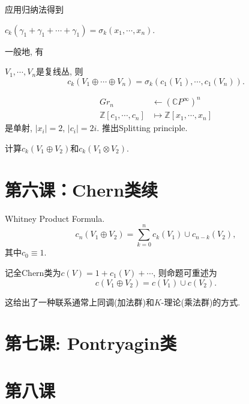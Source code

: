 \quad 应用归纳法得到

\begin{theorem}
    $c_k(\gamma_1 +\gamma_1+\cdots +\gamma_1) = \sigma_k(x_1, \cdots, x_n)$.
\end{theorem}

\quad 一般地, 有

\begin{theorem}
    $V_1, \cdots, V_n$是复线丛, 则
        $$c_k(V_1\oplus \cdots \oplus V_n) = \sigma_k(c_1(V_1), \cdots, c_1(V_n)).$$
\end{theorem}

\begin{align*}
        Gr_n &\leftarrow (\mathbb{C}P^\infty)^n\\
        \mathbb{Z}[c_1, \cdots, c_n] &\mapsto \mathbb{Z}[x_1, \cdots, x_n]
\end{align*}
是单射, $\vert x_i\vert=2$, $\vert c_i \vert=2i$. 推出Splitting principle.


\begin{exercise}
    计算$c_k(V_1\oplus V_2)$和$c_k(V_1 \otimes V_2)$.
\end{exercise}



\section{第六课：Chern类续}

\begin{proposition} Whitney Product Formula.
    $$c_n(V_1 \oplus V_2) = \sum\limits_{k=0}^n c_k(V_1) \cup c_{n-k}(V_2),$$
其中$c_0 \equiv 1$.

    \quad 记全Chern类为$c(V) = 1+c_1(V) + \cdots $, 则命题可重述为
        $$c(V_1 \oplus V_2) = c(V_1) \cup c(V_2).$$
\end{proposition}

\begin{remark}
    这给出了一种联系通常上同调(加法群)和$K$-理论(乘法群)的方式.
\end{remark}









\section{第七课: Pontryagin类}


\section{第八课}